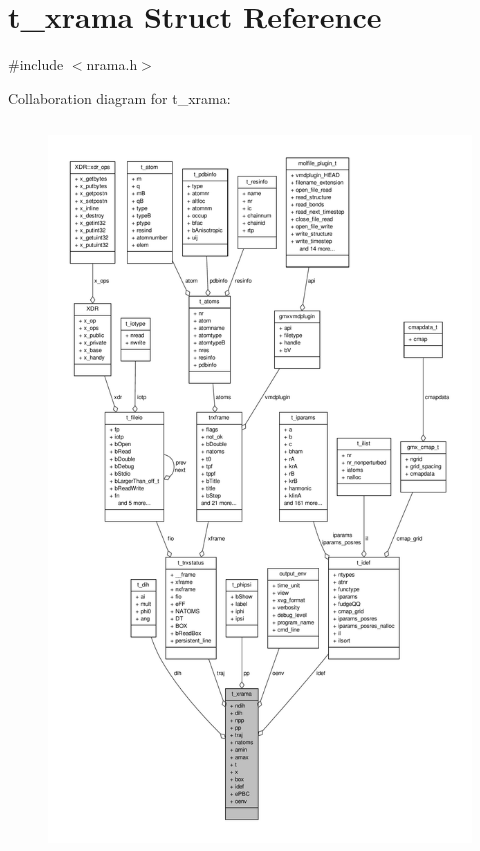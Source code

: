 \hypertarget{structt__xrama}{\section{t\-\_\-xrama \-Struct \-Reference}
\label{structt__xrama}
}


{\ttfamily \#include $<$nrama.\-h$>$}



\-Collaboration diagram for t\-\_\-xrama\-:
\nopagebreak
\begin{figure}[H]
\begin{center}
\leavevmode
\includegraphics[height=550pt]{structt__xrama__coll__graph}
\end{center}
\end{figure}

